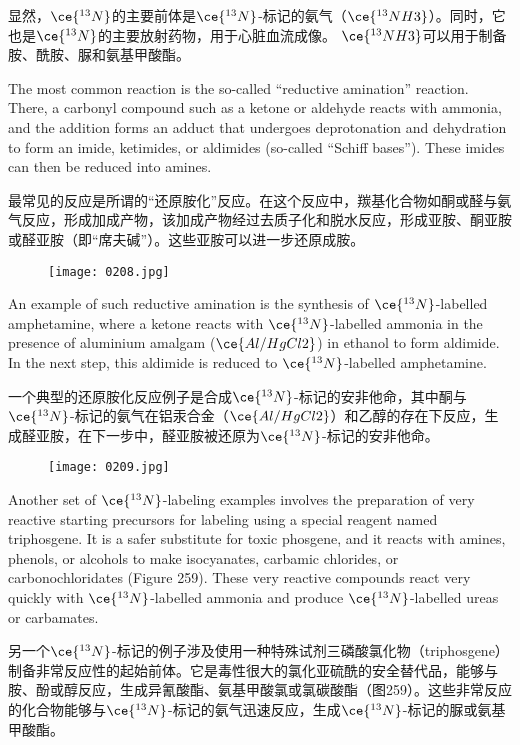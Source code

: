 \documentclass[dvipsnames, svgnames,a4paper,11pt]{article}
\begin{document}
显然，\(\ce{^{13}N}\)的主要前体是\(\ce{^{13}N}\)-标记的氨气（\(\ce{^{13}NH3}\)）。同时，它也是\(\ce{^{13}N}\)的主要放射药物，用于心脏血流成像。 \(\ce{^{13}NH3}\)可以用于制备胺、酰胺、脲和氨基甲酸酯。

The most common reaction is the so-called “reductive amination” reaction. There, a carbonyl compound such as a ketone or aldehyde reacts with ammonia, and the addition forms an adduct that undergoes deprotonation and dehydration to form an imide, ketimides, or aldimides (so-called “Schiff bases”). These imides can then be reduced into amines.

最常见的反应是所谓的“还原胺化”反应。在这个反应中，羰基化合物如酮或醛与氨气反应，形成加成产物，该加成产物经过去质子化和脱水反应，形成亚胺、酮亚胺或醛亚胺（即“席夫碱”）。这些亚胺可以进一步还原成胺。

\begin{figure*}[h]
	\centering
    \texttt{[image: 0208.jpg]}  
\end{figure*}

An example of such reductive amination is the synthesis of \(\ce{^{13}N}\)-labelled amphetamine, where a ketone reacts with \(\ce{^{13}N}\)-labelled ammonia in the presence of aluminium amalgam (\(\ce{Al/HgCl2}\)) in ethanol to form aldimide. In the next step, this aldimide is reduced to \(\ce{^{13}N}\)-labelled amphetamine.

一个典型的还原胺化反应例子是合成\(\ce{^{13}N}\)-标记的安非他命，其中酮与\(\ce{^{13}N}\)-标记的氨气在铝汞合金（\(\ce{Al/HgCl2}\)）和乙醇的存在下反应，生成醛亚胺，在下一步中，醛亚胺被还原为\(\ce{^{13}N}\)-标记的安非他命。

\begin{figure}[h]
	\centering
    \texttt{[image: 0209.jpg]}  
     \label{fig258}
\end{figure}

Another set of \(\ce{^{13}N}\)-labeling examples involves the preparation of very reactive starting precursors for labeling using a special reagent named triphosgene. It is a safer substitute for toxic phosgene, and it reacts with amines, phenols, or alcohols to make isocyanates, carbamic chlorides, or carbonochloridates (Figure 259). These very reactive compounds react very quickly with \(\ce{^{13}N}\)-labelled ammonia and produce \(\ce{^{13}N}\)-labelled ureas or carbamates.

另一个\(\ce{^{13}N}\)-标记的例子涉及使用一种特殊试剂三磷酸氯化物（triphosgene）制备非常反应性的起始前体。它是毒性很大的氯化亚硫酰的安全替代品，能够与胺、酚或醇反应，生成异氰酸酯、氨基甲酸氯或氯碳酸酯（图259）。这些非常反应的化合物能够与\(\ce{^{13}N}\)-标记的氨气迅速反应，生成\(\ce{^{13}N}\)-标记的脲或氨基甲酸酯。
\end{document}
